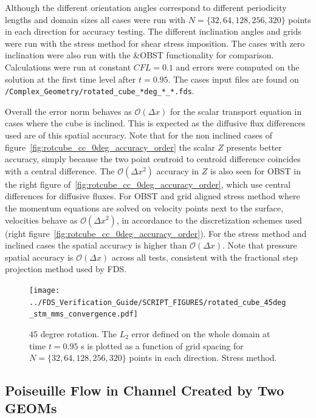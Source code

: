 \documentclass[11pt]{book}
\begin{document}
Although the different orientation angles correspond to different periodicity lengths and domain sizes all cases were run with $N=\{32,64,128,256,320\}$ points in each direction for accuracy testing. The different inclination angles and grids were run with the stress method for shear stress imposition. The cases with zero inclination were also run with the {\ct \&OBST} functionality for comparison. Calculations were run at constant $CFL=0.1$ and errors were computed on the solution at the first time level after $t=0.95$. The cases input files are found on \texttt{/Complex\_Geometry/rotated\_cube\_*deg\_*\_*.fds}.

Overall the error norm behaves as $\mathcal{O}(\Delta x)$ for the scalar transport equation in cases where the cube is inclined. This is expected as the diffusive flux differences used are of this spatial accuracy. Note that for the non inclined cases of figure~\ref{fig:rotcube_cc_0deg_accuracy_order} the scalar $Z$ presents better accuracy, simply because the two point centroid to centroid difference coincides with a central difference.
The $\mathcal{O}(\Delta x^2)$ accuracy in $Z$ is also seen for {\ct OBST} in the right figure of~\ref{fig:rotcube_cc_0deg_accuracy_order}, which use central differences for diffusive fluxes.
For {\ct OBST} and grid aligned stress method where the momentum equations are solved on velocity points next to the surface, velocities behave as $\mathcal{O}(\Delta x^2)$, in accordance to the discretization schemes used (right figure~\ref{fig:rotcube_cc_0deg_accuracy_order}). For the stress method and inclined cases the spatial accuracy is higher than $\mathcal{O}(\Delta x)$. Note that pressure spatial accuracy is $\mathcal{O}(\Delta x)$ across all tests, consistent with the fractional step projection method used by FDS.

\begin{figure}[ht]
\centering
\texttt{[image: ../FDS\_Verification\_Guide/SCRIPT\_FIGURES/rotated\_cube\_45deg\_stm\_mms\_convergence.pdf]}
\caption[The {\ct Rotated Cube CC} accuracy order test case]{$45$ degree rotation. The $L_2$ error defined on the whole domain at time $t = 0.95$ s is plotted as a function of grid spacing for $N=\{32,64,128,256,320\}$ points in each direction. Stress method.}\label{fig:rotcube_cc_45deg_accuracy_order}
\end{figure}



\subsection{Poiseuille Flow in Channel Created by Two GEOMs}
\end{document}
